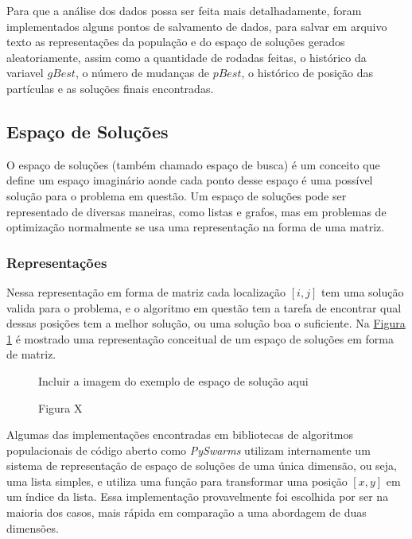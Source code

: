         Para que a análise dos dados possa ser feita mais detalhadamente, foram implementados alguns pontos de salvamento de dados, para salvar em arquivo texto as representações da população e do espaço de soluções gerados aleatoriamente, assim como a quantidade de rodadas feitas, o histórico da variavel $gBest$, o número de mudanças de $pBest$, o histórico de posição das partículas e as soluções finais encontradas.
    

    \subsection{Espaço de Soluções}
            O espaço de soluções (também chamado espaço de busca) é um conceito que define um espaço imaginário aonde cada ponto desse espaço é uma possível solução para o problema em questão. 
            Um espaço de soluções pode ser representado de diversas maneiras, como listas e grafos, mas em problemas de optimização normalmente se usa uma representação na forma de uma matriz.\newline
        

        \subsubsection{Representações}
            Nessa representação em forma de matriz cada localização $[i, j]$ tem uma solução valida para o problema, e o algoritmo em questão tem a tarefa de encontrar qual dessas posições tem a melhor solução, ou uma solução boa o suficiente. Na 
            \hyperref[fig:solution-space]{Figura \ref{fig:solution-space}} 
            é mostrado uma representação conceitual de um espaço de soluções em forma de matriz.\newline
            
            \begin{figure}[h]
                \centering
                \small{Incluir a imagem do exemplo de espaço de solução aqui}
                \caption{Figura X}
                \label{fig:solution-space}
            \end{figure}

            Algumas das implementações encontradas em bibliotecas de algoritmos populacionais de código aberto como \textit{PySwarms} utilizam internamente um sistema de representação de espaço de soluções de uma única dimensão, ou seja, uma lista simples, e utiliza uma função para transformar uma posição $[x,y]$ em um índice da lista. Essa implementação provavelmente foi escolhida por ser na maioria dos casos, mais rápida em comparação a uma abordagem de duas dimensões. \newline


